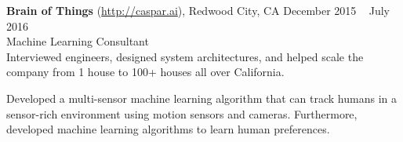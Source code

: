 \textbf{Brain of Things} (\url{http://caspar.ai}), Redwood City, CA \hfill December 2015 \textendash ~ July 2016\vspace{0mm}\\\vspace{0mm}
\hspace{-1.5mm} Machine Learning Consultant  \hfill \vspace{-5mm} \\

Interviewed engineers, designed system architectures, and helped scale the company from 1 house to 100+ houses all over California. 

\ifx\alltyperesume\undefined
\else
\newpage
\fi

Developed a multi-sensor machine learning algorithm that can track humans in a sensor-rich environment using motion sensors and cameras. Furthermore, developed machine learning algorithms to learn human preferences.

